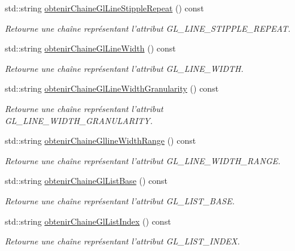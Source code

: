 \begin{DoxyCompactItemize}
std\-::string \hyperlink{group__utilitaire_gab9b326741292e41732d5e0b646c4f006}{obtenir\-Chaine\-Gl\-Line\-Stipple\-Repeat} () const 
\begin{DoxyCompactList}\small\item\em Retourne une chaîne représentant l'attribut G\-L\-\_\-\-L\-I\-N\-E\-\_\-\-S\-T\-I\-P\-P\-L\-E\-\_\-\-R\-E\-P\-E\-A\-T. \end{DoxyCompactList}\item 
std\-::string \hyperlink{group__utilitaire_gacd329652ea9f177db0c0ad44bc9150bd}{obtenir\-Chaine\-Gl\-Line\-Width} () const 
\begin{DoxyCompactList}\small\item\em Retourne une chaîne représentant l'attribut G\-L\-\_\-\-L\-I\-N\-E\-\_\-\-W\-I\-D\-T\-H. \end{DoxyCompactList}\item 
std\-::string \hyperlink{group__utilitaire_ga42e5a43f490a0f90bedf54064921de10}{obtenir\-Chaine\-Gl\-Line\-Width\-Granularity} () const 
\begin{DoxyCompactList}\small\item\em Retourne une chaîne représentant l'attribut G\-L\-\_\-\-L\-I\-N\-E\-\_\-\-W\-I\-D\-T\-H\-\_\-\-G\-R\-A\-N\-U\-L\-A\-R\-I\-T\-Y. \end{DoxyCompactList}\item 
std\-::string \hyperlink{group__utilitaire_gacdf3e63f9464f755958fb682f2a45015}{obtenir\-Chaine\-Glline\-Width\-Range} () const 
\begin{DoxyCompactList}\small\item\em Retourne une chaîne représentant l'attribut G\-L\-\_\-\-L\-I\-N\-E\-\_\-\-W\-I\-D\-T\-H\-\_\-\-R\-A\-N\-G\-E. \end{DoxyCompactList}\item 
std\-::string \hyperlink{group__utilitaire_ga869ac6c34aaec533fb74b4e8095ae993}{obtenir\-Chaine\-Gl\-List\-Base} () const 
\begin{DoxyCompactList}\small\item\em Retourne une chaîne représentant l'attribut G\-L\-\_\-\-L\-I\-S\-T\-\_\-\-B\-A\-S\-E. \end{DoxyCompactList}\item 
std\-::string \hyperlink{group__utilitaire_ga4486b4e688ef8a216e16b7c1a6ec7a61}{obtenir\-Chaine\-Gl\-List\-Index} () const 
\begin{DoxyCompactList}\small\item\em Retourne une chaîne représentant l'attribut G\-L\-\_\-\-L\-I\-S\-T\-\_\-\-I\-N\-D\-E\-X. \end{DoxyCompactList}\item 

\end{DoxyCompactItemize}
